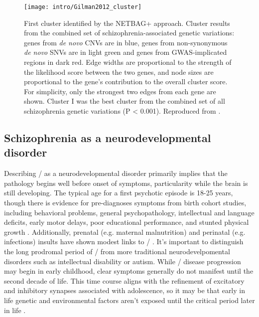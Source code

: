 \begin{figure}
	\centering
	\texttt{[image: intro/Gilman2012\_cluster]}
	\caption[First cluster identified by the NETBAG+ approach]{First cluster identified by the NETBAG+ approach.
	Cluster results from the combined set of schizophrenia-associated genetic variations: genes from \emph{de novo} CNVs are in blue, genes from non-synonymous \emph{de novo} SNVs are in light green and genes from GWAS-implicated regions in dark red. Edge widths are proportional to the strength of the likelihood score between the two genes, and node sizes are proportional to the gene’s contribution to the overall cluster score. For simplicity, only the strongest two edges from each gene are shown. Cluster I was the best cluster from the combined set of all schizophrenia genetic variations (P < 0.001).
	Reproduced from \citet{Gilman2012}.}
	\label{fig:intro:scz:cluster}
\end{figure}

\subsection{Schizophrenia as a neurodevelopmental disorder}
\label{sec:intro:scz:neurodevelopment}
Describing \scz/ as a neurodevelopmental disorder primarily implies that the pathology begins well before onset of symptoms, particularity while the brain is still developing.
The typical age for a first psychotic episode is 18-25 years, though there is evidence for pre-diagnoses symptoms from birth cohort studies, including behavioral problems, general psychopathology, intellectual and language deficits, early motor delays, poor educational performance, and stunted physical growth \citep{Welham2009}.
Additionally, prenatal (e.g. maternal malnutrition) and perinatal (e.g. infections) insults have shown modest links to \scz/ \citep{Lewis2002}.
It's important to distinguish the long prodromal period of \scz/ from more traditional neurodevelpomental disorders such as intellectual disability or autism.
While \scz/ disease progression may begin in early childhood, clear symptoms generally do not manifest until the second decade of life.
This time course aligns with the refinement of excitatory and inhibitory synapses associated with adolescence, so it may be that early in life genetic and environmental factors aren't exposed until the critical period later in life \citep[\autoref{fig:intro:scz:neurodevelopmental},][]{Insel2010a}.

